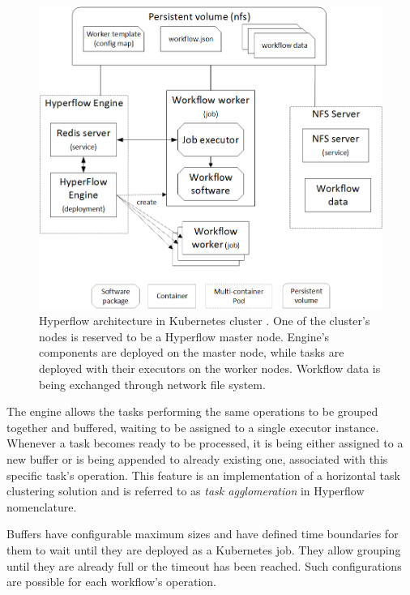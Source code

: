 \begin{figure}[H]
\centering
\includegraphics[width=0.6\linewidth]{figures/2-4-hyperflow-k8s-arch.png}
\caption[Hyperflow architecture in Kubernetes cluster]{Hyperflow architecture in Kubernetes cluster \cite{b:Hyperflow-k8s-deployment}. One of the cluster's nodes is reserved to be a Hyperflow master node.
Engine's components are deployed on the master node, while tasks are deployed with their executors on the worker nodes.
Workflow data is being exchanged through network file system.}


\label{fig:hyperflow:architecture}
\end{figure}

The engine allows the tasks performing the same operations to be grouped together and buffered, waiting to be assigned to a single executor instance.
Whenever a task becomes ready to be processed, it is being either assigned to a new buffer or is being appended to already existing one, associated with this specific task's operation.
This feature is an implementation of a horizontal task clustering solution and is referred to as \emph{task agglomeration} in Hyperflow nomenclature.

Buffers have configurable maximum sizes and have defined time boundaries for them to wait until they are deployed as a Kubernetes job.
They allow grouping until they are already full or the timeout has been reached.
Such configurations are possible for each workflow's operation.

